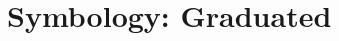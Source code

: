 \chapter{Symbology: Graduated}

\pagestyle{fancy}
\fancyhf{}
\fancyhead[OC]{\leftmark}
\fancyhead[EC]{\rightmark}
\cfoot{\thepage}












